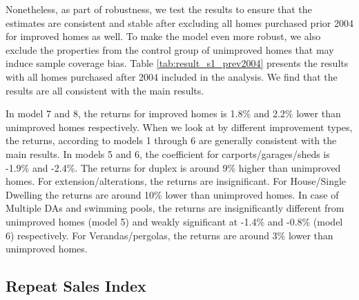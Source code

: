 \documentclass[AEJ,reqno, draftmode]{AEA} %
\begin{document}
Nonetheless, as part of robustness, we test the results to ensure that the estimates are consistent and stable after excluding all homes purchased prior 2004 for improved homes as well. To make the model even more robust, we also exclude the properties from the control group of unimproved homes that may induce sample coverage bias. Table \ref{tab:result_s1_prev2004} presents the results with all homes purchased after 2004 included in the analysis. We find that the results are all consistent with the main results. 

In model 7 and 8, the returns for improved homes is 1.8\% and 2.2\% lower than unimproved homes respectively. When we look at by different improvement types, the returns, according to models 1 through 6 are generally consistent with the main results. In models 5 and 6, the coefficient for carports/garages/sheds is -1.9\% and -2.4\%. The returns for duplex is around 9\% higher than unimproved homes. For extension/alterations, the returns are insignificant. For House/Single Dwelling the returns are around 10\% lower than unimproved homes. In case of Multiple DAs and swimming pools, the returns are insignificantly different from unimproved homes (model 5) and weakly significant at -1.4\% and -0.8\% (model 6) respectively. For Verandas/pergolas, the returns are around 3\% lower than unimproved homes.


\restoregeometry



\subsection{Repeat Sales Index}
\end{document}
